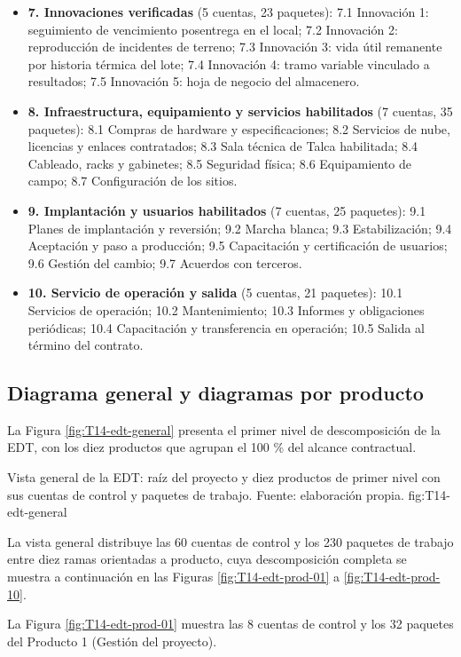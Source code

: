 \begin{itemize}[leftmargin=1.4em,itemsep=2pt]
\item \textbf{7. Innovaciones verificadas} (5 cuentas, 23 paquetes): 7.1 Innovación 1: seguimiento de vencimiento posentrega en el local; 7.2 Innovación 2: reproducción de incidentes de terreno; 7.3 Innovación 3: vida útil remanente por historia térmica del lote; 7.4 Innovación 4: tramo variable vinculado a resultados; 7.5 Innovación 5: hoja de negocio del almacenero.
\item \textbf{8. Infraestructura, equipamiento y servicios habilitados} (7 cuentas, 35 paquetes): 8.1 Compras de hardware y especificaciones; 8.2 Servicios de nube, licencias y enlaces contratados; 8.3 Sala técnica de Talca habilitada; 8.4 Cableado, racks y gabinetes; 8.5 Seguridad física; 8.6 Equipamiento de campo; 8.7 Configuración de los sitios.
\item \textbf{9. Implantación y usuarios habilitados} (7 cuentas, 25 paquetes): 9.1 Planes de implantación y reversión; 9.2 Marcha blanca; 9.3 Estabilización; 9.4 Aceptación y paso a producción; 9.5 Capacitación y certificación de usuarios; 9.6 Gestión del cambio; 9.7 Acuerdos con terceros.
\item \textbf{10. Servicio de operación y salida} (5 cuentas, 21 paquetes): 10.1 Servicios de operación; 10.2 Mantenimiento; 10.3 Informes y obligaciones periódicas; 10.4 Capacitación y transferencia en operación; 10.5 Salida al término del contrato.
\end{itemize}

\subsection{Diagrama general y diagramas por producto}

La Figura \ref{fig:T14-edt-general} presenta el primer nivel de descomposición de la EDT, con los diez productos que agrupan el 100 \% del alcance contractual.

  {Vista general de la EDT: raíz del proyecto y diez productos de primer nivel con sus cuentas de control y paquetes de trabajo. Fuente: elaboración propia.}
  {fig:T14-edt-general}

La vista general distribuye las 60 cuentas de control y los 230 paquetes de trabajo entre diez ramas orientadas a producto, cuya descomposición completa se muestra a continuación en las Figuras \ref{fig:T14-edt-prod-01} a \ref{fig:T14-edt-prod-10}.

La Figura \ref{fig:T14-edt-prod-01} muestra las 8 cuentas de control y los 32 paquetes del Producto 1 (Gestión del proyecto).

